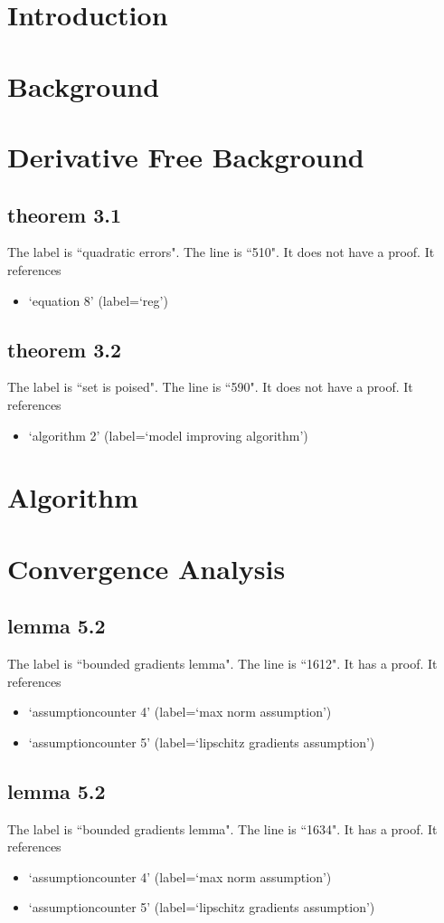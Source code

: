 \documentclass{article}
\begin{document}
\section{Introduction}
\section{Background}
\section{Derivative Free Background}
\subsection{theorem 3.1}
The label is ``quadratic errors".
The line is ``510".
It does not have a proof.
It references \begin{itemize}
\item `equation 8' (label=`reg')
\end{itemize}
\subsection{theorem 3.2}
The label is ``set is poised".
The line is ``590".
It does not have a proof.
It references \begin{itemize}
\item `algorithm 2' (label=`model improving algorithm')
\end{itemize}
\section{Algorithm}
\section{Convergence Analysis}
\subsection{lemma 5.2}
The label is ``bounded gradients lemma".
The line is ``1612".
It has a proof.
It references \begin{itemize}
\item `assumptioncounter 4' (label=`max norm assumption')
\item `assumptioncounter 5' (label=`lipschitz gradients assumption')
\end{itemize}
\subsection{lemma 5.2}
The label is ``bounded gradients lemma".
The line is ``1634".
It has a proof.
It references \begin{itemize}
\item `assumptioncounter 4' (label=`max norm assumption')
\item `assumptioncounter 5' (label=`lipschitz gradients assumption')
\end{itemize}
\end{document}
